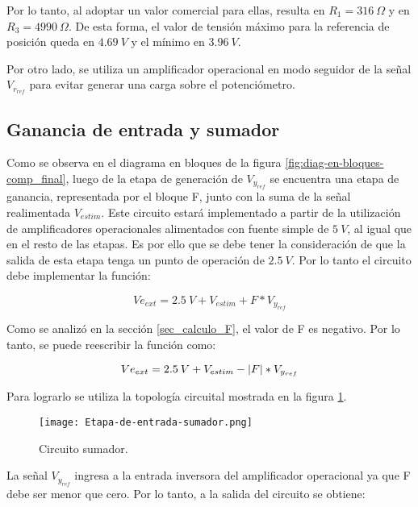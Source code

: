 Por lo tanto, al adoptar un valor comercial para ellas, resulta en $R_1 = 316 \:\Omega$ y en $R_3 = 4990 \:\Omega$. De esta forma, el valor de tensión máximo para la referencia de posición queda en $4.69\:V$ y el mínimo en $3.96\:V$.

Por otro lado, se utiliza un amplificador operacional en modo seguidor de la señal $V_{r_{ref}}$ para evitar generar una carga sobre el potenciómetro. 

\subsection{Ganancia de entrada y sumador}

Como se observa en el diagrama en bloques de la figura \ref{fig:diag-en-bloques-comp_final}, luego de la etapa de generación de $V_{y_{ref}}$ se encuentra una etapa de ganancia, representada por el bloque F, junto con la suma de la señal realimentada $V_{estim}$. Este circuito estará implementado a partir de la utilización de amplificadores operacionales alimentados con fuente simple de $5\:V$, al igual que en el resto de las etapas. Es por ello que se debe tener la consideración de que la salida de esta etapa tenga un punto de operación de $2.5\:V$. Por lo tanto el circuito debe implementar la función:

\begin{equation*} 
	Ve_{ext}= 2.5\:V + V_{estim} + F*V_{y_{ref}}
\end{equation*}

Como se analizó en la sección \ref{sec_calculo_F}, el valor de F es negativo. Por lo tanto, se puede reescribir la función como:

\begin{equation} \label{eq_transferencia_veext}
	Ve_{ext}= 2.5\:V + V_{estim} - \lvert F\rvert*V_{y_{ref}}
\end{equation}

Para lograrlo se utiliza la topología circuital mostrada en la figura \ref{fig:etapa-de-entrada-sumador}.

\begin{figure}[H]
	\centering
	\texttt{[image: Etapa-de-entrada-sumador.png]}
	\caption{Circuito sumador.}
	\label{fig:etapa-de-entrada-sumador}
\end{figure}

La señal $V_{y_{ref}}$ ingresa a la entrada inversora del amplificador operacional ya que F debe ser menor que cero. Por lo tanto, a la salida del circuito se obtiene:

